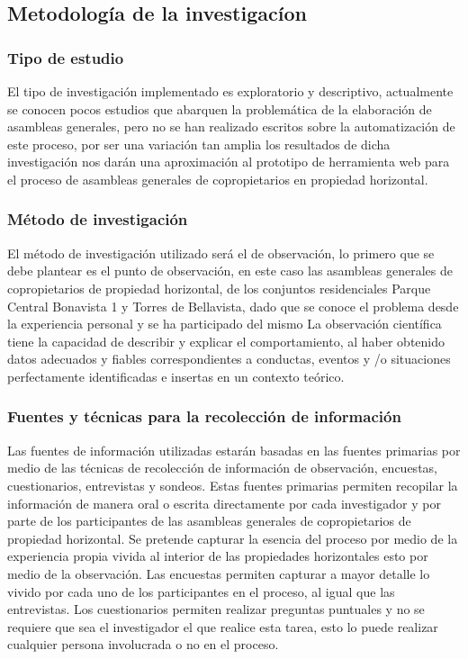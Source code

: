 \subsection{Metodología de la investigacíon}

\subsubsection{Tipo de estudio}

El tipo de investigación implementado es exploratorio y descriptivo, actualmente se conocen pocos estudios que abarquen la problemática de la elaboración de asambleas generales, pero no se han realizado escritos sobre la automatización de este proceso, por ser una variación tan amplia los resultados de dicha investigación nos darán una aproximación al prototipo de herramienta web para el proceso de asambleas generales de copropietarios en propiedad horizontal.

\subsubsection{Método de investigación}

El método de investigación utilizado será el de observación, lo primero que se debe plantear es el punto de observación, en este caso las asambleas generales de copropietarios de propiedad horizontal, de los conjuntos residenciales Parque Central Bonavista 1 y Torres de Bellavista, dado que se conoce el problema desde la experiencia personal y se ha participado del mismo
La observación científica tiene la capacidad de describir y explicar el comportamiento, al haber obtenido datos adecuados y fiables correspondientes a conductas, eventos y /o situaciones perfectamente identificadas e insertas en un contexto teórico.

\subsubsection{Fuentes y técnicas para la recolección de información}

Las fuentes de información utilizadas estarán basadas en las fuentes primarias por medio de las técnicas de recolección de información de observación, encuestas, cuestionarios, entrevistas y sondeos. Estas fuentes primarias permiten recopilar la información de manera oral o escrita directamente por cada investigador y por parte de los participantes de las asambleas generales de copropietarios de propiedad horizontal.
Se pretende capturar la esencia del proceso por medio de la experiencia propia vivida al interior de las propiedades horizontales esto por medio de la observación. Las encuestas permiten capturar a mayor detalle lo vivido por cada uno de los participantes en el proceso, al igual que las entrevistas. Los cuestionarios permiten realizar preguntas puntuales y no se requiere que sea el investigador el que realice esta tarea, esto lo puede realizar cualquier persona involucrada o no en el proceso.


